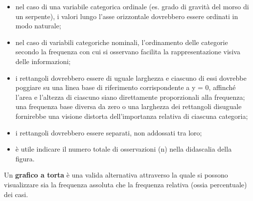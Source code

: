\documentclass[10pt, draft]{book}
\begin{document}
\begin{itemize}
    \item nel caso di una variabile categorica ordinale (es. grado di gravità del morso di un serpente), i valori lungo l'asse orizzontale dovrebbero essere ordinati in modo naturale;
    \item nel caso di variabili categoriche nominali, l'ordinamento delle categorie secondo la frequenza con cui si osservano facilita la rappresentazione visiva delle informazioni;
    \item i rettangoli dovrebbero essere di uguale larghezza e ciascuno di essi dovrebbe poggiare su una linea base di riferimento corrispondente a y = 0, affinché l'area e l'altezza di ciascuno siano direttamente proporzionali alla frequenza; una frequenza base diversa da zero o una larghezza dei rettangoli disuguale fornirebbe una visione distorta dell'importanza relativa di ciascuna categoria;
    \item i rettangoli dovrebbero essere separati, non addossati tra loro;
    \item è utile indicare il numero totale di osservazioni (n) nella didascalia della figura.
\end{itemize}
Un \textbf{grafico a torta} è una valida alternativa attraverso la quale si possono visualizzare sia la frequenza assoluta che la frequenza relativa (ossia percentuale) dei casi.
\end{document}
